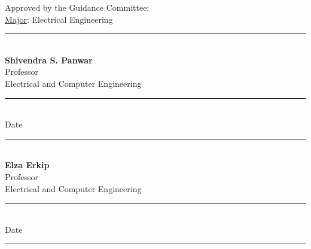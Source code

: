  \newpage 
 
 \baselineskip
 \setcounter{page}{2}
 \vspace{0.5in}
 \noindent Approved by the Guidance Committee:%
 \vspace{0.5in} \\
\underline{Major}:\makebox[0.1in]{ } Electrical Engineering  %
\vspace{0.6in} \\
 \makebox[2.8in]{ } \rule{2.5in}{.005in} \vspace{0.05in} \\ 
 \makebox[2.8in]{ } {\bf Shivendra S. Panwar} \vspace{0.05in} \\
 \makebox[2.8in]{ } Professor \vspace{0.05in} \\
 \makebox[2.8in]{ } Electrical and Computer Engineering %
 \vspace{0.3in}  \\ 
 \makebox[2.8in]{ } \rule{2in}{.005in}  \vspace{0.05in} \\
 \makebox[3.6in]{ } Date \vspace{0.6in}\\
 \makebox[2.8in]{ } \rule{2.5in}{.005in} \vspace{0.05in} \\
 \makebox[2.8in]{ } {\bf Elza Erkip} \vspace{0.05in} \\
 \makebox[2.8in]{ } Professor  \vspace{0.05in} \\
 \makebox[2.8in]{ } Electrical and Computer Engineering %
 \vspace{0.3in}  \\ 
 \makebox[2.8in]{ } \rule{2in}{.005in} \vspace{0.05in} \\
 \makebox[3.6in]{ } Date \vspace{0.6in}\\
 \makebox[2.8in]{ } \rule{2.5in}{.005in} \vspace{0.05in} \\
